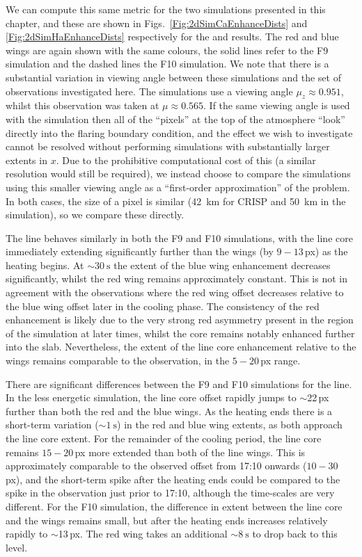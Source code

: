 We can compute this same metric for the two simulations presented in this chapter, and these are shown in Figs.~\ref{Fig:2dSimCaEnhanceDists} and \ref{Fig:2dSimHaEnhanceDists} respectively for the \CaLine{} and \Ha{} results.
The red and blue wings are again shown with the same colours, the solid lines refer to the F9 simulation and the dashed lines the F10 simulation.
We note that there is a substantial variation in viewing angle between these simulations and the set of observations investigated here.
The simulations use a viewing angle $\mu_z\approx0.951$, whilst this observation was taken at $\mu\approx0.565$.
If the same viewing angle is used with the simulation then all of the ``pixels'' at the top of the atmosphere ``look'' directly into the flaring boundary condition, and the effect we wish to investigate cannot be resolved without performing simulations with substantially larger extents in $x$.
Due to the prohibitive computational cost of this (a similar resolution would still be required), we instead choose to compare the simulations using this smaller viewing angle as a ``first-order approximation'' of the problem.
In both cases, the size of a pixel is similar (\SI{42}{\kilo\metre} for CRISP and \SI{50}{\kilo\metre} in the simulation), so we compare these directly.

The \CaLine{} line behaves similarly in both the F9 and F10 simulations, with the line core immediately extending significantly further than the wings (by $9-13$\,{}px) as the heating begins.
At $\sim\SI{30}{\second}$ the extent of the blue wing enhancement decreases significantly, whilst the red wing remains approximately constant.
This is not in agreement with the observations where the red wing offset decreases relative to the blue wing offset later in the cooling phase.
The consistency of the red enhancement is likely due to the very strong red asymmetry present in the \regiona{} region of the simulation at later times, whilst the core remains notably enhanced further into the slab.
Nevertheless, the extent of the line core enhancement relative to the wings remains comparable to the observation, in the $5-20$\,{}px range.

There are significant differences between the F9 and F10 simulations for the \Ha{} line.
In the less energetic simulation, the line core offset rapidly jumps to $\sim$22\,{}px further than both the red and the blue wings.
As the heating ends there is a short-term variation ($\sim\SI{1}{\second}$) in the red and blue wing extents, as both approach the line core extent.
For the remainder of the cooling period, the line core remains $15-20$\,{}px more extended than both of the line wings.
This is approximately comparable to the observed offset from 17:10 onwards ($10-30$\,{}px), and the short-term spike after the heating ends could be compared to the spike in the observation just prior to 17:10, although the time-scales are very different.
For the F10 simulation, the difference in extent between the line core and the wings remains small, but after the heating ends increases relatively rapidly to $\sim$13\,{}px.
The red wing takes an additional $\sim\SI{8}{\second}$ to drop back to this level.

